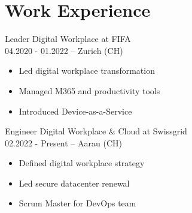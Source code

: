 \documentclass{article}
\begin{document}
\section*{Work Experience}

  
    \textbfGroup Leader Digital Workplace at FIFA \\
    04.2020 - 01.2022 -- Zurich (CH) \\
    \begin{itemize}
    
      \item Led digital workplace transformation
    
      \item Managed M365 and productivity tools
    
      \item Introduced Device-as-a-Service
    
    \end{itemize}
  

  
    \textbfPrincipal Engineer Digital Workplace & Cloud at Swissgrid \\
    02.2022 - Present -- Aarau (CH) \\
    \begin{itemize}
    
      \item Defined digital workplace strategy
    
      \item Led secure datacenter renewal
    
      \item Scrum Master for DevOps team
    
    \end{itemize}
  
\end{document}
